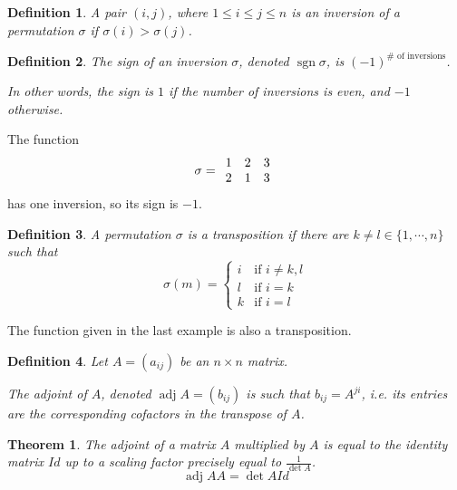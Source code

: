 \documentclass{article}
\newtheorem{definition}{Definition}
\newtheorem{theorem}{Theorem}
\DeclareMathOperator{\sgn}{sgn}
\DeclareMathOperator{\adj}{adj}
\begin{document}
\begin{definition}
    A pair $(i, j)$, where $1 \leq i \leq j \leq n$ is an \emph{inversion} of a
    permutation $\sigma$ if $\sigma(i) > \sigma(j)$.
\end{definition}

\begin{definition}
    The \emph{sign} of an inversion $\sigma$, denoted $\sgn{\sigma}$, is
    $(-1)^{\# \text{ of inversions}}$.

    In other words, the sign is $1$ if the number of inversions is even, and
    $-1$ otherwise.
\end{definition}

The function
$$
    \sigma =
    \begin{array}{c c c}
        1 & 2 & 3 \\
        2 & 1 & 3
    \end{array}
$$
has one inversion, so its sign is $-1$.

\begin{definition}
    A permutation $\sigma$ is a \emph{transposition} if there are $k \neq l \in
    \{1, \cdots, n\}$ such that
    $$
        \sigma(m) =
        \begin{cases}
            i & \text{if } i \neq k, l \\
            l & \text{if } i = k \\
            k & \text{if } i = l
        \end{cases}
    $$
\end{definition}

The function given in the last example is also a transposition.



\begin{definition}
    Let $A = (a_{ij})$ be an $n \times n$ matrix.

    The \emph{adjoint} of $A$, denoted
    $\adj A = (b_{ij})$
    is such that
    $b_{ij} = A^{ji}$,
    i.e. its entries are the corresponding cofactors in the transpose of $A$.
\end{definition}

\begin{theorem}
    The adjoint of a matrix $A$ multiplied by $A$ is equal to the identity
    matrix $Id$ up to a scaling factor precisely equal to
    $\frac{1}{\det A}$.
    \begin{equation*}
        \adj{A} A = \det{A} Id
    \end{equation*}
\end{theorem}
\end{document}
